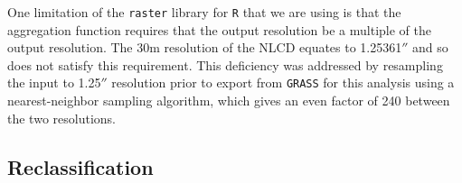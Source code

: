 One limitation of the \texttt{raster} library for \texttt{R} that we
are using is that the aggregation function requires that the output
resolution be a multiple of the output resolution.  The 30m resolution
of the NLCD equates to 1.25361$''$ and so does not satisfy this
requirement.  This deficiency was addressed by resampling the input to
1.25$''$ resolution prior to export from \texttt{GRASS} for this
analysis using a nearest-neighbor sampling algorithm, which gives an
even factor of 240 between the two resolutions.


\clearpage

\subsection{Reclassification}
\label{sec:nlcd-reclass}



